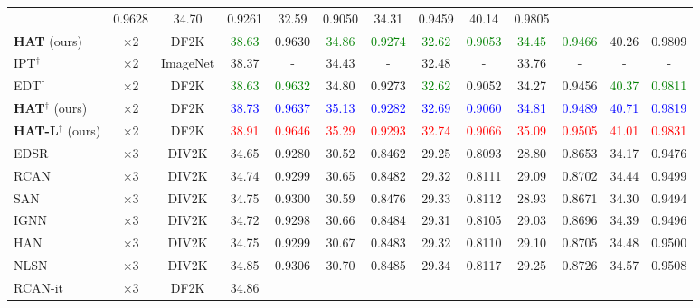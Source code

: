 \documentclass[10pt,twocolumn,letterpaper]{article}
\begin{document}
\begin{table*}[!ht]
\begin{center}
{\begin{tabular}{|l|c|c|c|c|c|c|c|c|c|c|c|c|}
& {0.9628}
& {34.70}
& {0.9261}
& {32.59}
& {0.9050}
& {34.31}
& {0.9459}
& {40.14}
& {0.9805}
\\
\textbf{HAT} (ours) & $\times$2 & DF2K & \textcolor{green}{38.63}
& {0.9630}
& \textcolor{green}{34.86}
& \textcolor{green}{0.9274}
& \textcolor{green}{32.62}
& \textcolor{green}{0.9053}
& \textcolor{green}{34.45}
& \textcolor{green}{0.9466}
& {40.26}
& {0.9809}
\\
\hdashline
IPT$^\dagger$ & $\times$2 & ImageNet & {38.37}
& {-}
& {34.43}
& {-}
& {32.48}
& {-}
& {33.76}
& {-}
& {-}
& {-}
\\
EDT$^\dagger$ & $\times$2 & DF2K & \textcolor{green}{38.63}
& \textcolor{green}{0.9632}
& 34.80
& 0.9273
& \textcolor{green}{32.62}
& {0.9052}
& 34.27
& 0.9456
& \textcolor{green}{40.37}
& \textcolor{green}{0.9811}
\\
\textbf{HAT}$^\dagger$ (ours) & $\times$2 & DF2K & \textcolor{blue}{38.73}
& \textcolor{blue}{0.9637}
& \textcolor{blue}{35.13}
& \textcolor{blue}{0.9282}
& \textcolor{blue}{32.69}
& \textcolor{blue}{0.9060}
& \textcolor{blue}{34.81}
& \textcolor{blue}{0.9489}
& \textcolor{blue}{40.71}
& \textcolor{blue}{0.9819}
\\
\textbf{HAT-L}$^\dagger$ (ours) & $\times$2 & DF2K & \textcolor{red}{38.91}
& \textcolor{red}{0.9646}
& \textcolor{red}{35.29}
& \textcolor{red}{0.9293}
& \textcolor{red}{32.74}
& \textcolor{red}{0.9066}
& \textcolor{red}{35.09}
& \textcolor{red}{0.9505}
& \textcolor{red}{41.01}
& \textcolor{red}{0.9831}
\\
\hline
\hline
EDSR & $\times$3 & DIV2K & 34.65
& 0.9280
& 30.52
& 0.8462
& 29.25
& 0.8093
& 28.80
& 0.8653
& 34.17
& 0.9476
\\
RCAN & $\times$3 & DIV2K & 34.74
& 0.9299
& 30.65
& 0.8482
& 29.32
& 0.8111
& 29.09
& 0.8702
& 34.44
& 0.9499
\\
SAN & $\times$3 & DIV2K & {34.75}
& {0.9300}
& {30.59}
& {0.8476}
& {29.33}
& {0.8112}
& {28.93}
& {0.8671}
& {34.30}
& {0.9494}
\\
IGNN & $\times$3 & DIV2K & {34.72}
& {0.9298}
& {30.66}
& {0.8484}
& {29.31}
& {0.8105}
& {29.03}
& {0.8696}
& {34.39}
& {0.9496}
\\
HAN  & $\times$3 & DIV2K & {34.75}
& {0.9299}
& {30.67}
& {0.8483}
& {29.32}
& {0.8110}
& {29.10}
& {0.8705}
& {34.48}
& {0.9500}
\\
NLSN & $\times$3 & DIV2K & 34.85 
& 0.9306 
& 30.70 
& 0.8485 
& 29.34 
& 0.8117 
& {29.25}
& {0.8726}
& 34.57 
& 0.9508  
\\
RCAN-it & $\times$3 & DF2K & {34.86}

\end{tabular}}
\end{center}
\end{table*}
\end{document}
